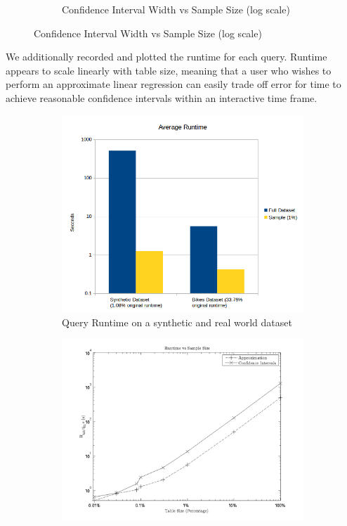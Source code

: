 \documentclass[twoside]{article}
\begin{document}
\begin{figure}[htb]
\begin{subfigure}{0.45\textwidth}
                \caption{Confidence Interval Width vs Sample Size (log scale)}
                \label{fig:confidence}
        \end{subfigure}
\end{figure}

We additionally recorded and plotted the runtime for each query. Runtime appears to scale linearly with table size, meaning that a user who wishes to perform an approximate linear regression can easily trade off error for time to achieve reasonable confidence intervals within an interactive time frame.

\begin{figure}[htb]
        \centering
        \begin{subfigure}{0.45\textwidth}
                \includegraphics[width=\textwidth]{synthvreal}
                \caption{Query Runtime on a synthetic and real world dataset}
                \label{fig:synthvreal}
        \end{subfigure}
        \begin{subfigure}{0.45\textwidth}
                \includegraphics[width=\textwidth]{runtime}

\end{subfigure}
\end{figure}
\end{document}
